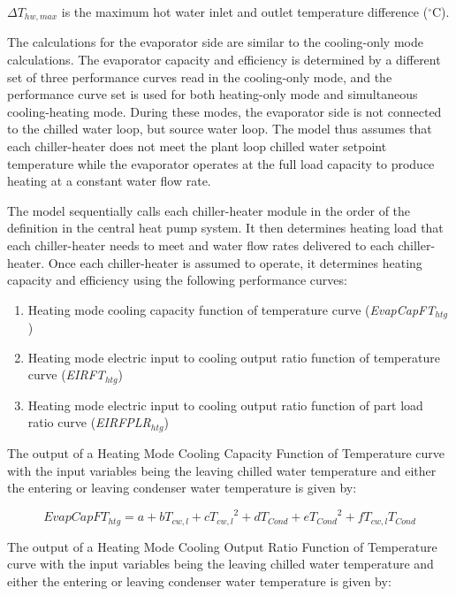 \(\Delta {T_{hw,max}}\) is the maximum hot water inlet and outlet temperature difference (\(^{\circ}\)C).

The calculations for the evaporator side are similar to the cooling-only mode calculations. The evaporator capacity and efficiency is determined by a different set of three performance curves read in the cooling-only mode, and the performance curve set is used for both heating-only mode and simultaneous cooling-heating mode. During these modes, the evaporator side is not connected to the chilled water loop, but source water loop. The model thus assumes that each chiller-heater does not meet the plant loop chilled water setpoint temperature while the evaporator operates at the full load capacity to produce heating at a constant water flow rate.

The model sequentially calls each chiller-heater module in the order of the definition in the central heat pump system. It then determines heating load that each chiller-heater needs to meet and water flow rates delivered to each chiller-heater. Once each chiller-heater is assumed to operate, it determines heating capacity and efficiency using the following performance curves:

\begin{enumerate}
\item Heating mode cooling capacity function of temperature curve (\emph{EvapCapFT\(_{htg}\)})
\item Heating mode electric input to cooling output ratio function of temperature curve (\emph{EIRFT\(_{htg}\)})
\item Heating mode electric input to cooling output ratio function of part load ratio curve (\emph{EIRFPLR\(_{htg}\)})
\end{enumerate}

The output of a Heating Mode Cooling Capacity Function of Temperature curve with the input variables being the leaving chilled water temperature and either the entering or leaving condenser water temperature is given by:

\begin{equation}
EvapCapF{T_{htg}} = a + b{T_{cw,l}} + c{T_{cw,l}}^2 + d{T_{Cond}} + e{T_{Cond}}^2 + f{T_{cw,l}}{T_{Cond}}
\end{equation}

The output of a Heating Mode Cooling Output Ratio Function of Temperature curve with the input variables being the leaving chilled water temperature and either the entering or leaving condenser water temperature is given by:

